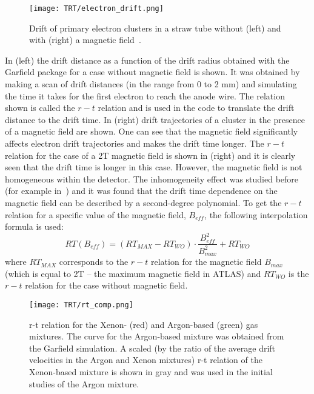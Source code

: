 \begin{figure}[h]
\begin{center}
 \texttt{[image: TRT/electron\_drift.png]}
\caption {Drift of primary electron clusters in a straw tube without (left) and with (right) a magnetic field~\cite{cwetanski_thesis}. 
}
\label{fig:clusterDriftInTube}
\end{center}
\end{figure}

In  (left) the drift distance as a function of the drift radius obtained with the Garfield package for a case without magnetic field is shown.
It was obtained by making a scan of drift distances (in the range from 0 to 2 mm) and simulating the time it takes for the first electron to reach the anode wire.
The relation shown is called the $r-t$ relation and is used in the code to translate the drift distance to the drift time.
In  (right) drift trajectories of a cluster in the presence of a magnetic field are shown. One can see that the magnetic field
significantly affects electron drift trajectories and makes the drift time longer. The $r-t$ relation for the case of a 2T magnetic field is shown
in  (right) and it is clearly seen that the drift time is longer in this case. However, the magnetic field is not homogeneous within the detector.
The inhomogeneity effect was studied before (for example in~\cite{esben_thesis}) and it was found that the drift time dependence on the magnetic field can be described by a second-degree polynomial. 
To get the $r-t$ relation for a specific value of the magnetic field, $B_{eff}$, the following interpolation formula is used:
\begin{displaymath}
    RT(B_{eff}) = (RT_{MAX} - RT_{WO}) \cdot \dfrac{B_{eff}^2}{B_{max}^2} + RT_{WO}
\end{displaymath}
where $RT_{MAX}$ corresponds to the $r-t$ relation for the magnetic field $B_{max}$ (which is equal to 2T -- the maximum magnetic field in ATLAS) and $RT_{WO}$ is the 
$r-t$ relation for the case without magnetic field.

\begin{figure}[h]
\centering
 \texttt{[image: TRT/rt\_comp.png]}
\caption{r-t relation for the Xenon- (red) and Argon-based (green) gas mixtures. The curve for the Argon-based mixture was obtained from the Garfield simulation. 
A scaled (by the ratio of the average drift velocities in the Argon and Xenon mixtures) 
r-t relation of the Xenon-based mixture is shown in gray and was used in the initial studies of the Argon mixture.
}
\label{fig:rt_comp}
\end{figure}

